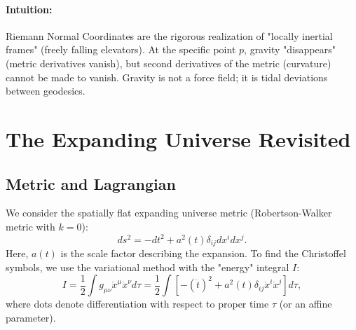 \documentclass[11pt, a4paper]{report}
\begin{document}
\paragraph{Intuition:} Riemann Normal Coordinates are the rigorous realization of "locally inertial frames" (freely falling elevators). At the specific point \(p\), gravity "disappears" (metric derivatives vanish), but second derivatives of the metric (curvature) cannot be made to vanish. Gravity is not a force field; it is tidal deviations between geodesics.
\section{The Expanding Universe Revisited}

\subsection*{Metric and Lagrangian}
We consider the spatially flat expanding universe metric (Robertson-Walker metric with \(k=0\)):
\begin{equation}
ds^2 = -dt^2 + a^2(t) \delta_{ij} dx^i dx^j.
\end{equation}
Here, \(a(t)\) is the scale factor describing the expansion. To find the Christoffel symbols, we use the variational method with the "energy" integral \(I\):
\begin{equation}
I = \frac{1}{2} \int g_{\mu\nu} \dot{x}^\mu \dot{x}^\nu d\tau = \frac{1}{2} \int \left[ -(\dot{t})^2 + a^2(t) \delta_{ij} \dot{x}^i \dot{x}^j \right] d\tau,
\end{equation}
where dots denote differentiation with respect to proper time \(\tau\) (or an affine parameter).
\end{document}
